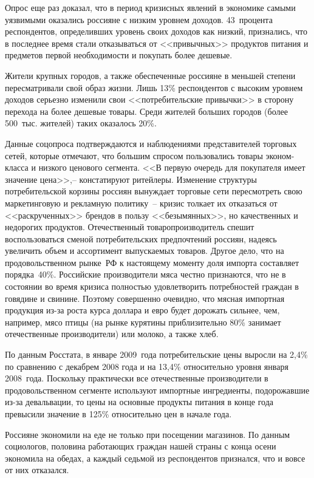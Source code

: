   Опрос еще раз доказал, что в период кризисных явлений в экономике самыми
  уязвимыми оказались россияне с низким уровнем доходов. 43~процента
  респондентов, определивших уровень своих доходов как низкий, признались, что
  в последнее время стали отказываться от <<привычных>> продуктов питания и
  предметов первой необходимости и покупать более дешевые.

  Жители крупных городов, а также обеспеченные россияне в меньшей степени
  пересматривали свой образ жизни. Лишь 13\% респондентов с высоким уровнем
  доходов серьезно изменили свои <<потребительские привычки>> в сторону
  перехода на более дешевые товары. Среди жителей больших городов (более
  500~тыс. жителей) таких оказалось 20\%.

  Данные соцопроса подтверждаются и наблюдениями представителей торговых сетей,
  которые отмечают, что большим спросом пользовались товары эконом-класса и
  низкого ценового сегмента. <<В первую очередь для покупателя имеет значение
  цена>>,-- констатируют ритейлеры. Изменение структуры потребительской корзины
  россиян вынуждает торговые сети пересмотреть свою маркетинговую и рекламную
  политику~-- кризис толкает их отказаться от <<раскрученных>> брендов в пользу
  <<безымянных>>, но качественных и недорогих продуктов. Отечественный
  товаропроизводитель спешит воспользоваться сменой потребительских
  предпочтений россиян, надеясь увеличить объем и ассортимент выпускаемых
  товаров. Другое дело, что на продовольственном рынке~РФ к настоящему моменту
  доля импорта составляет порядка~40\%. Российские производители мяса честно
  признаются, что не в состоянии во время кризиса полностью удовлетворить
  потребностей граждан в говядине и свинине. Поэтому совершенно очевидно, что
  мясная импортная продукция из-за роста курса доллара и евро будет дорожать
  сильнее, чем, например, мясо птицы (на рынке курятины приблизительно 80\%
  занимает отечественные производители) или молоко, а также хлеб.

  По данным Росстата, в январе 2009~года потребительские цены выросли на 2,4\%
  по сравнению с декабрем 2008 года и на 13,4\% относительно уровня января
  2008~года. Поскольку практически все отечественные производители в
  продовольственном сегменте используют импортные ингредиенты, подорожавшие
  из-за девальвации, то цены на основные продукты питания в конце года
  превысили значение в 125\% относительно цен в начале года.

  Россияне экономили на еде не только при посещении магазинов. По данным
  социологов, половина работающих граждан нашей страны с конца осени экономила
  на обедах, а каждый седьмой из респондентов признался, что и вовсе от них
  отказался.


